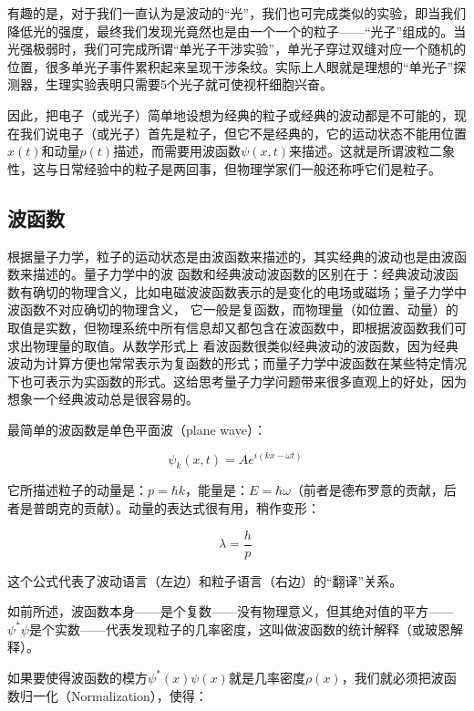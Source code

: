 有趣的是，对于我们一直认为是波动的“光”，我们也可完成类似的实验，即当我们降低光的强度，最终我们发现光竟然也是由一个一个的粒子——“光子”组成的。当光强极弱时，我们可完成所谓“单光子干涉实验”，单光子穿过双缝对应一个随机的位置，很多单光子事件累积起来呈现干涉条纹。实际上人眼就是理想的“单光子”探测器，生理实验表明只需要5个光子就可使视杆细胞兴奋。

因此，把电子（或光子）简单地设想为经典的粒子或经典的波动都是不可能的，现在我们说电子（或光子）首先是粒子，但它不是经典的，它的运动状态不能用位置$x(t)$和动量$p(t)$描述，而需要用波函数$\psi(x,t)$来描述。这就是所谓波粒二象性，这与日常经验中的粒子是两回事，但物理学家们一般还称呼它们是粒子。

\subsection{波函数}

根据量子力学，粒子的运动状态是由波函数来描述的，其实经典的波动也是由波函数来描述的。量子力学中的波
函数和经典波动波函数的区别在于：经典波动波函数有确切的物理含义，比如电磁波波函数表示的是变化的电场或磁场；量子力学中波函数不对应确切的物理含义，
它一般是复函数，而物理量（如位置、动量）的取值是实数，但物理系统中所有信息却又都包含在波函数中，即根据波函数我们可求出物理量的取值。从数学形式上
看波函数很类似经典波动的波函数，因为经典波动为计算方便也常常表示为复函数的形式；而量子力学中波函数在某些特定情况下也可表示为实函数的形式。这给思考量子力学问题带来很多直观上的好处，因为想象一个经典波动总是很容易的。

最简单的波函数是单色平面波（plane wave）：

\begin{equation}
\psi_k (x, t) = A e^{i(kx -\omega t)}~
\end{equation}

它所描述粒子的动量是：$p = \hbar k$，能量是：$E = \hbar
\omega$（前者是德布罗意的贡献，后者是普朗克的贡献）。动量的表达式很有用，稍作变形：

\begin{equation}
\lambda = \frac{h}{p}~
\end{equation}

这个公式代表了波动语言（左边）和粒子语言（右边）的“翻译”关系。

如前所述，波函数本身——是个复数——没有物理意义，但其绝对值的平方——$\psi^* \psi $是个实数——代表发现粒子的几率密度，这叫做波函数的统计解释（或玻恩解释）。

如果要使得波函数的模方$\psi^*(x) \psi(x)$就是几率密度$\rho(x)$，我们就必须把波函数归一化（Normalization），使得：

